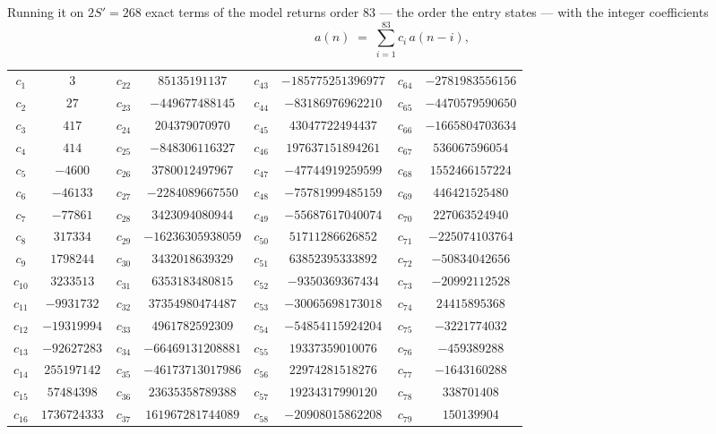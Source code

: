 \documentclass[11pt,a4paper]{article}
\theoremstyle{plain}
\theoremstyle{definition}
\begin{document}
Running it on $2S'=268$ exact terms of the model returns order $83$ --- the order the
entry states --- with the integer coefficients
\[
a(n)\;=\;\sum_{i=1}^{83}c_i\,a(n-i),
\]
\begin{center}\small
\begin{tabular}{cccccccc}
$c_{1}$ & $3$ & $c_{22}$ & $85135191137$ & $c_{43}$ & $-185775251396977$ & $c_{64}$ & $-2781983556156$ \\
$c_{2}$ & $27$ & $c_{23}$ & $-449677488145$ & $c_{44}$ & $-83186976962210$ & $c_{65}$ & $-4470579590650$ \\
$c_{3}$ & $417$ & $c_{24}$ & $204379070970$ & $c_{45}$ & $43047722494437$ & $c_{66}$ & $-1665804703634$ \\
$c_{4}$ & $414$ & $c_{25}$ & $-848306116327$ & $c_{46}$ & $197637151894261$ & $c_{67}$ & $536067596054$ \\
$c_{5}$ & $-4600$ & $c_{26}$ & $3780012497967$ & $c_{47}$ & $-47744919259599$ & $c_{68}$ & $1552466157224$ \\
$c_{6}$ & $-46133$ & $c_{27}$ & $-2284089667550$ & $c_{48}$ & $-75781999485159$ & $c_{69}$ & $446421525480$ \\
$c_{7}$ & $-77861$ & $c_{28}$ & $3423094080944$ & $c_{49}$ & $-55687617040074$ & $c_{70}$ & $227063524940$ \\
$c_{8}$ & $317334$ & $c_{29}$ & $-16236305938059$ & $c_{50}$ & $51711286626852$ & $c_{71}$ & $-225074103764$ \\
$c_{9}$ & $1798244$ & $c_{30}$ & $3432018639329$ & $c_{51}$ & $63852395333892$ & $c_{72}$ & $-50834042656$ \\
$c_{10}$ & $3233513$ & $c_{31}$ & $6353183480815$ & $c_{52}$ & $-9350369367434$ & $c_{73}$ & $-20992112528$ \\
$c_{11}$ & $-9931732$ & $c_{32}$ & $37354980474487$ & $c_{53}$ & $-30065698173018$ & $c_{74}$ & $24415895368$ \\
$c_{12}$ & $-19319994$ & $c_{33}$ & $4961782592309$ & $c_{54}$ & $-54854115924204$ & $c_{75}$ & $-3221774032$ \\
$c_{13}$ & $-92627283$ & $c_{34}$ & $-66469131208881$ & $c_{55}$ & $19337359010076$ & $c_{76}$ & $-459389288$ \\
$c_{14}$ & $255197142$ & $c_{35}$ & $-46173713017986$ & $c_{56}$ & $22974281518276$ & $c_{77}$ & $-1643160288$ \\
$c_{15}$ & $57484398$ & $c_{36}$ & $23635358789388$ & $c_{57}$ & $19234317990120$ & $c_{78}$ & $338701408$ \\
$c_{16}$ & $1736724333$ & $c_{37}$ & $161967281744089$ & $c_{58}$ & $-20908015862208$ & $c_{79}$ & $150139904$ \\

\end{tabular}
\end{center}
\end{document}
